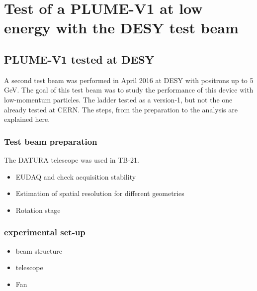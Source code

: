 \chapter{Test of a PLUME-V1 at low energy with the DESY test beam}

  \section{PLUME-V1 tested at DESY}

   A second test beam was performed in April 2016 at DESY with positrons up to 5 GeV. 
   The goal of this test beam was to study the performance of this device with low-momentum particles.
   The ladder tested as a version-1, but not the one already tested at CERN.
   The steps, from the preparation to the analysis are explained here.

    \subsection{Test beam preparation}

    The DATURA telescope was used in TB-21. 
    \begin{itemize}
      \item EUDAQ and check acquisition stability
      \item Estimation of spatial resolution for different geometries
      \item Rotation stage
    \end{itemize}

    \begin{figure}
    \end{figure}

    \begin{figure}
    \end{figure}

    \subsection{experimental set-up}

    \begin{itemize}
      \item beam structure
      \item telescope
      \item Fan
    \end{itemize}
    \begin{figure}
    \end{figure}

